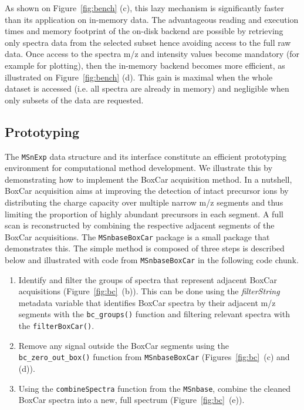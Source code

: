 \documentclass[journal=jacsat,manuscript=article]{achemso}\usepackage[]{graphicx}\usepackage[]{color}
\begin{document}
As shown on Figure~\ref{fig:bench} (c), this lazy mechanism is
significantly faster than its application on in-memory data. The
advantageous reading and execution times and memory footprint of the
on-disk backend are possible by retrieving only spectra data from the selected
subset hence avoiding access to the full raw
data. Once access to the spectra m/z and intensity values become
mandatory (for example for plotting), then the in-memory backend
becomes more efficient, as illustrated on Figure~\ref{fig:bench}
(d). This gain is maximal when the whole dataset is accessed
(i.e. all spectra are already in memory) and negligible when only subsets of the
data are requested.


\subsection{Prototyping}

The \texttt{MSnExp} data structure and its interface constitute an
efficient prototyping environment for computational method
development. We illustrate this by demonstrating how to implement the
BoxCar\cite{Meier:2018} acquisition method. In a nutshell, BoxCar
acquisition aims at improving the detection of intact precursor ions
by distributing the charge capacity over multiple narrow m/z segments
and thus limiting the proportion of highly abundant precursors in each
segment. A full scan is reconstructed by combining the respective
adjacent segments of the BoxCar acquisitions. The
\texttt{MSnbaseBoxCar} package\cite{MSnbaseBoxCar} is a small package
that demonstrates this. The simple method is composed of three steps
is described below and illustrated with code from
\texttt{MSnbaseBoxCar} in the following code chunk.

\begin{enumerate}

\item Identify and filter the groups of spectra that represent
  adjacent BoxCar acquisitions (Figure~\ref{fig:bc}~(b)). This can be
  done using the \textit{filterString} metadata variable that
  identifies BoxCar spectra by their adjacent m/z segments with the
  \texttt{bc\_groups()} function and filtering relevant spectra with
  the \texttt{filterBoxCar()}.

\item Remove any signal outside the BoxCar segments using the
  \texttt{bc\_zero\_out\_box()} function from \texttt{MSnbaseBoxCar}
  (Figures~\ref{fig:bc}~(c) and (d)).


\item Using the \texttt{combineSpectra} function from the
  \texttt{MSnbase}, combine the cleaned BoxCar spectra into a new,
  full spectrum (Figure~\ref{fig:bc}~(e)).

\end{enumerate}
\end{document}

